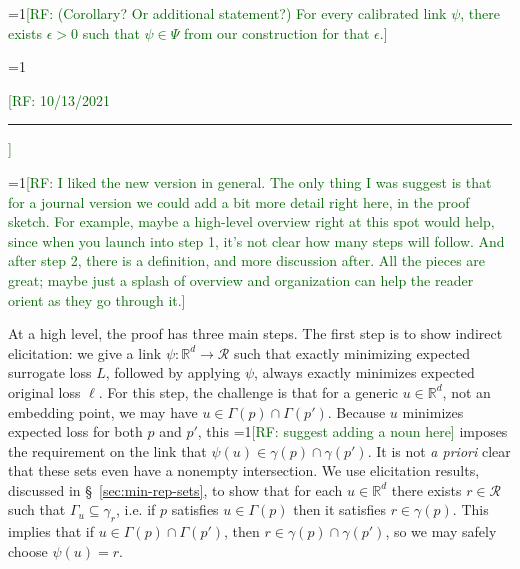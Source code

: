 \documentclass[11pt]{article}
\newcommand{\Comments}{1}
\newcommand{\mynote}[2]{\ifnum\Comments=1\textcolor{#1}{#2}\fi}
\newcommand{\raf}[1]{\mynote{darkgreen}{[RF: #1]}}
\newcommand{\reals}{\mathbb{R}}
\newcommand{\R}{\mathcal{R}}
\newcommand{\inprod}[2]{\langle #1, #2 \rangle}%
\DeclareMathOperator*{\argmin}{arg\,min}
\begin{document}
\raf{(Corollary? Or additional statement?) For every calibrated link $\psi$, there exists $\epsilon>0$ such that $\psi \in \Psi$ from our construction for that $\epsilon$.}

\raf{10/13/2021 \hrule}

\bigskip

\raf{I liked the new version in general.  The only thing I was suggest is that for a journal version we could add a bit more detail right here, in the proof sketch.  For example, maybe a high-level overview right at this spot would help, since when you launch into step 1, it's not clear how many steps will follow.  And after step 2, there is a definition, and more discussion after.  All the pieces are great; maybe just a splash of overview and organization can help the reader orient as they go through it.}

At a high level, the proof has three main steps.
The first step is to show indirect elicitation: we give a link $\psi: \reals^d \to \R$ such that exactly minimizing expected surrogate loss $L$, followed by applying $\psi$, always exactly minimizes expected original loss $\ell$.
For this step, the challenge is that for a generic $u \in \reals^d$, not an embedding point, we may have $u \in \Gamma(p) \cap \Gamma(p')$.
Because $u$ minimizes expected loss for both $p$ and $p'$, this \raf{suggest adding a noun here} imposes the requirement on the link that $\psi(u) \in \gamma(p) \cap \gamma(p')$.
It is not \emph{a priori} clear that these sets even have a nonempty intersection.
We use elicitation results, discussed in \S~\ref{sec:min-rep-sets}, to show that for each $u \in \reals^d$ there exists $r \in \R$ such that $\Gamma_u \subseteq \gamma_r$, i.e. if $p$ satisfies $u \in \Gamma(p)$ then it satisfies $r \in \gamma(p)$.
This implies that if $u \in \Gamma(p) \cap \Gamma(p')$, then $r \in \gamma(p) \cap \gamma(p')$, so we may safely choose $\psi(u) = r$.

\end{document}
